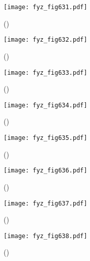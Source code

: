     \begin{figure}[ht!] %
      \centering
      \texttt{[image: fyz\_fig631.pdf]}
      \caption{
               (\cite[s.~707]{Feynman02})}
      \label{fyz:fig631}
    \end{figure}

    \begin{figure}[ht!] %
      \centering
      \texttt{[image: fyz\_fig632.pdf]}
      \caption{
               (\cite[s.~707]{Feynman02})}
      \label{fyz:fig632}
    \end{figure}

    \begin{figure}[ht!] %
      \centering
      \texttt{[image: fyz\_fig633.pdf]}
      \caption{
               (\cite[s.~707]{Feynman02})}
      \label{fyz:fig633}
    \end{figure}

    \begin{figure}[ht!] %
      \centering
      \texttt{[image: fyz\_fig634.pdf]}
      \caption{
               (\cite[s.~707]{Feynman02})}
      \label{fyz:fig634}
    \end{figure}

    \begin{figure}[ht!] %
      \centering
      \texttt{[image: fyz\_fig635.pdf]}
      \caption{
               (\cite[s.~707]{Feynman02})}
      \label{fyz:fig635}
    \end{figure}

    \begin{figure}[ht!] %
      \centering
      \texttt{[image: fyz\_fig636.pdf]}
      \caption{
               (\cite[s.~707]{Feynman02})}
      \label{fyz:fig636}
    \end{figure}

    \begin{figure}[ht!] %
      \centering
      \texttt{[image: fyz\_fig637.pdf]}
      \caption{
               (\cite[s.~707]{Feynman02})}
      \label{fyz:fig637}
    \end{figure}

    \begin{figure}[ht!] %
      \centering
      \texttt{[image: fyz\_fig638.pdf]}
      \caption{
               (\cite[s.~707]{Feynman02})}
      \label{fyz:fig638}
    \end{figure}

